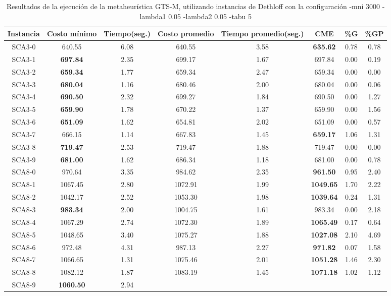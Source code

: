 \begin{table}[h]
\caption{Resultados de la ejecución de la metaheurística GTS-M, utilizando instancias de Dethloff con la configuración -mni 3000 -lambda1 0.05 -lambda2 0.05 -tabu 5}
\centering
\small
\begin{tabular}{c c c c c c c c}
\hline\hline
Instancia & Costo mínimo & Tiempo(seg.) & Costo promedio & Tiempo promedio(seg.) & CME & \%G & \%GP \\ [0.5ex]
\hline
SCA3-0 & 640.55 & 6.08 & 
640.55 & 3.58 & \bf{635.62} & 
0.78 & 0.78\\SCA3-1 & \bf{697.84} & 2.35 & 
699.17 & 1.67 & 697.84 & 0.00
 & 0.19\\SCA3-2 & \bf{659.34} & 1.77 & 
659.34 & 2.47 & 659.34 & 0.00
 & 0.00\\
SCA3-3 & \bf{680.04} & 1.16 & 
680.46 & 2.00 & 680.04 & 0.00
 & 0.06\\SCA3-4 & \bf{690.50} & 2.32 & 
699.27 & 1.84 & 690.50 & 0.00
 & 1.27\\SCA3-5 & \bf{659.90} & 1.78 & 
670.22 & 1.37 & 659.90 & 0.00
 & 1.56\\SCA3-6 & \bf{651.09} & 1.62 & 
654.81 & 2.02 & 651.09 & 0.00
 & 0.57\\SCA3-7 & 666.15 & 1.14 & 
667.83 & 1.45 & \bf{659.17} & 
1.06 & 1.31\\SCA3-8 & \bf{719.47} & 2.53 & 
719.47 & 1.88 & 719.47 & 0.00
 & 0.00\\
SCA3-9 & \bf{681.00} & 1.62 & 
686.34 & 1.18 & 681.00 & 0.00
 & 0.78\\SCA8-0 & 970.64 & 3.35 & 
984.62 & 2.35 & \bf{961.50} & 
0.95 & 2.40\\SCA8-1 & 1067.45 & 2.80 & 
1072.91 & 1.99 & \bf{1049.65} & 
1.70 & 2.22\\SCA8-2 & 1042.17 & 2.52 & 
1053.30 & 1.98 & \bf{1039.64} & 
0.24 & 1.31\\SCA8-3 & \bf{983.34} & 2.00 & 
1004.75 & 1.61 & 983.34 & 0.00
 & 2.18\\SCA8-4 & 1067.29 & 2.74 & 
1072.30 & 1.89 & \bf{1065.49} & 
0.17 & 0.64\\SCA8-5 & 1048.65 & 3.40 & 
1075.27 & 1.88 & \bf{1027.08} & 
2.10 & 4.69\\SCA8-6 & 972.48 & 4.31 & 
987.13 & 2.27 & \bf{971.82} & 
0.07 & 1.58\\SCA8-7 & 1066.65 & 1.31 & 
1075.46 & 2.01 & \bf{1051.28} & 
1.46 & 2.30\\SCA8-8 & 1082.12 & 1.87 & 
1083.19 & 1.45 & \bf{1071.18} & 
1.02 & 1.12\\SCA8-9 & \bf{1060.50} & 2.94 & 

\end{tabular}
\end{table}
